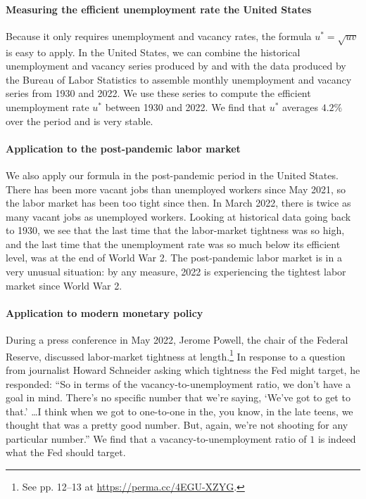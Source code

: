 \documentclass[letterpaper,12pt,leqno]{article}
\begin{document}
\paragraph{Measuring the efficient unemployment rate the United States} Because it only requires unemployment and vacancy rates, the formula $u^* = \sqrt{uv}$ is easy to apply. In the United States, we can combine the historical unemployment and vacancy series produced by \citet{B10d} and \citet{PZ21} with the data produced by the Bureau of Labor Statistics to assemble monthly unemployment and vacancy series from 1930 and 2022. We use these series to compute the efficient unemployment rate $u^*$ between 1930 and 2022. We find that $u^*$ averages $4.2\%$ over the period and is very stable. 

\paragraph{Application to the post-pandemic labor market} We also apply our formula in the post-pandemic period in the United States. There has been more vacant jobs than unemployed workers since May 2021, so the labor market has been too tight since then. In March 2022, there is twice as many vacant jobs as unemployed workers. Looking at historical data going back to 1930, we see that the last time that the labor-market tightness was so high, and the last time that the unemployment rate was so much below its efficient level, was at the end of World War 2. The post-pandemic labor market is in a very unusual situation: by any measure, 2022 is experiencing the tightest labor market since World War 2.

\paragraph{Application to modern monetary policy} During a press conference in May 2022, Jerome Powell, the chair of the Federal Reserve, discussed labor-market tightness at length.\footnote{See pp. 12--13 at \url{https://perma.cc/4EGU-XZYG}.} In response to a question from journalist Howard Schneider asking which tightness the Fed might target, he responded: ``So in terms of the vacancy-to-unemployment ratio, we don't have a goal in mind. There's no specific number that we're saying, `We've got to get to that.'  \dots I think when we got to one-to-one in the, you know, in the late teens, we thought that was a pretty good number. But, again, we're not shooting for any particular number.'' We find that a vacancy-to-unemployment ratio of $1$ is indeed what the Fed should target.
\end{document}
